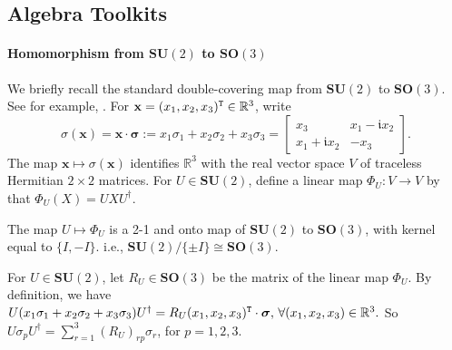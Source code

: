 
\subsection{Algebra Toolkits}
\paragraph{Homomorphism from $\mathbf{SU}(2)$ to $\mathbf{SO}(3)$}\label{para: SU2 and SO3}

We briefly recall the standard double-covering map from $\mathbf{SU}(2)$ to $\mathbf{SO}(3).$
See for example, \cite{Hall2015LieGroups}.
For $\mathbf{x}=(x_1,x_2,x_3)^{\tt T}\in\mathbb R^3$, write
\[
    \sigma(\mathbf{x})=\mathbf{x}\mathbin{\cdot}\boldsymbol{\sigma}
    :=x_1\sigma_1+x_2\sigma_2+x_3\sigma_3=\left[\begin{matrix}
        x_3 & x_1-\mathfrak{i}x_2\\
        x_1+ \mathfrak{i}x_2 & -x_3
    \end{matrix}\right].
\]
The map $\mathbf{x}\mapsto\sigma(\mathbf{x})$ identifies $\mathbb R^3$ with the real vector
space $V$ of traceless Hermitian $2\times 2$ matrices.  
For $U\in\mathbf{SU}(2)$, define a linear map $\Phi_U:V\to V$ by
that
$
    \Phi_U(X)=UXU^{\dagger}.
$

\begin{proposition}
    The map $U\mapsto \Phi_U$ is a 2-1 and onto map of $\mathbf{SU}(2)$ to $\mathbf{SO}(3)$, with kernel equal to $\{I,-I\}$. i.e., $\mathbf{SU}(2)/\{\pm I\}\cong \mathbf{SO}(3).$
\end{proposition}

For $U\in \mathbf{SU}(2)$, let $R_U\in \mathbf{SO}(3)$ be the matrix of the linear map $\Phi_U.$ 
By definition, we have $U(x_1\sigma_1+x_2\sigma_2+x_3\sigma_3)U^\dagger=R_U(x_1,x_2,x_3)^{\tt T}\cdot \boldsymbol{\sigma},\,\forall (x_1,x_2,x_3)\in \mathbb{R}^3.$
So $U\sigma_pU^{\dagger}=\sum_{r=1}^3(R_U)_{rp}\sigma_r$, for $p=1,2,3.$
